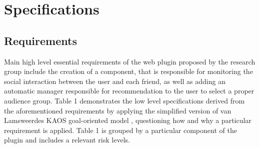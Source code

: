 \documentclass[a4paper,11pt]{article}
\begin{document}
\section{Specifications}

\subsection{Requirements}
\noindent Main high level essential requirements of the web plugin proposed by the research group include the creation of a component, that is responsible for monitoring the social interaction between the user and each friend, as well as adding an automatic manager responsible for recommendation to the user to select a proper audience group. Table 1 demonstrates the low level specifications derived from the aforementioned requirements by applying the simplified version of van Lamsweerde\textquotesingle s KAOS goal-oriented model \cite{KAOS}, questioning how and why a particular requirement is applied. Table 1 is grouped by a particular component of the plugin and includes a relevant risk levels.
\end{document}
